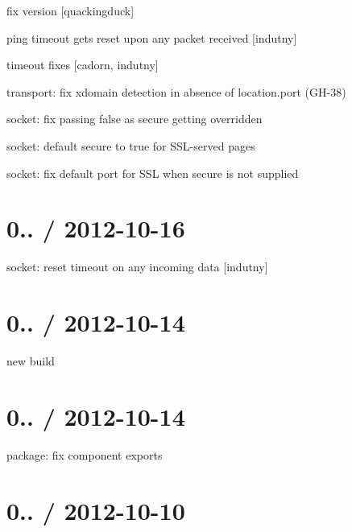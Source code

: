 \begin{DoxyItemize}
\item fix {\ttfamily version} \mbox{[}quackingduck\mbox{]}
\item ping timeout gets reset upon any packet received \mbox{[}indutny\mbox{]}
\item timeout fixes \mbox{[}cadorn, indutny\mbox{]}
\item transport\+: fix xdomain detection in absence of location.\+port (G\+H-\/38)
\item socket\+: fix passing {\ttfamily false} as secure getting overridden
\item socket\+: default {\ttfamily secure} to {\ttfamily true} for S\+S\+L-\/served pages
\item socket\+: fix default port for S\+SL when {\ttfamily secure} is not supplied
\end{DoxyItemize}

\section*{0.. / 2012-\/10-\/16 }


\begin{DoxyItemize}
\item socket\+: reset timeout on any incoming data \mbox{[}indutny\mbox{]}
\end{DoxyItemize}

\section*{0.. / 2012-\/10-\/14 }


\begin{DoxyItemize}
\item new build
\end{DoxyItemize}

\section*{0.. / 2012-\/10-\/14 }


\begin{DoxyItemize}
\item package\+: fix {\ttfamily component} exports
\end{DoxyItemize}

\section*{0.. / 2012-\/10-\/10 }



